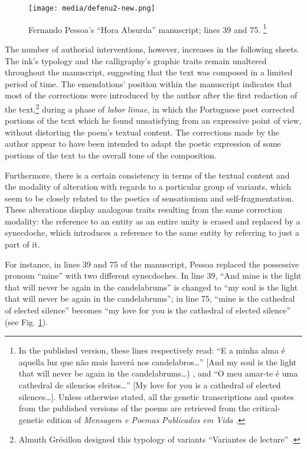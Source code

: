 \documentclass{article}
\begin{document}
\begin{figure}
    \centering
    \texttt{[image: media/defenu2-new.png]}
    \caption{Fernando Pessoa's ``Hora Absurda'' manuscript; lines 39 and 75.
    \footnote{In the published version, these lines respectively read: ``E a minha alma é aquella luz que não mais haverá nos candelabros\ldots{}'' [And my soul is the light that will never be again in the candelabrums\ldots) \mancite\parencite[42; line 39]{pessoa_mensagem_2018}, and ``O meu amar-te é uma cathedral de silencios eleitos\ldots'' [My love for you is a cathedral of elected silences\ldots]\parencite[43; line 75]{pessoa_mensagem_2018}. Unless otherwise stated, all the genetic
  transcriptions and quotes from the published versions of the poems are
  retrieved from the critical-genetic edition of \emph{Mensagem e Poemas
  Publicados em Vida} \parencite{pessoa_mensagem_2018}.}}     
    \label{fig:defenu2-new}
\end{figure}




The number of authorial interventions, however, increases in the
following sheets. The ink's typology and the calligraphy's graphic
traits remain unaltered throughout the manuscript, suggesting that the
text was composed in a limited period of time. The emendations' position
within the manuscript indicates that most of the corrections were
introduced by the author after the first redaction of the
text,\footnote{Almuth Grésillon designed this typology of variants
  ``Variantes de lecture'' \parencite[112]{gresillon_les_1988}.} during a phase of \emph{labor
limae}, in which the Portuguese poet corrected portions of the text
which he found unsatisfying from an expressive point of view, without
distorting the poem's textual content. The corrections made by the
author appear to have been intended to adapt the poetic expression of
some portions of the text to the overall tone of the composition.

Furthermore, there is a certain consistency in terms of the textual
content and the modality of alteration with regards to a particular
group of variants, which seem to be closely related to the poetics of
sensationism and self-fragmentation. These alterations display analogous
traits resulting from the same correction modality: the reference to an
entity as an entire unity is erased and replaced by a synecdoche, which
introduces a reference to the same entity by referring to just a part of
it.

For instance, in lines 39 and 75 of the manuscript, Pessoa replaced the
possessive pronoun ``mine'' with two different synecdoches. In line 39,
``And mine is the light that will never be again in the candelabrums''
is changed to ``my soul is the light that will never be again in the
candelabrums''; in line 75, ``mine is the cathedral of elected silence''
becomes ``my love for you is the cathedral of elected
silence'' (see Fig. \ref{fig:defenu2-new}).
\end{document}
